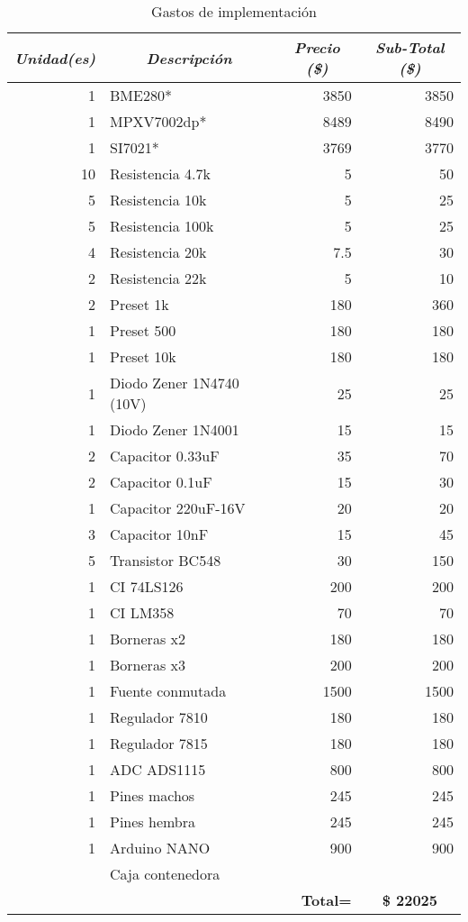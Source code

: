 \begin{table}[H]
	\centering
	\begin{tabular}{|r|l|r|r|}
		\hline
		\multicolumn{1}{|c|}{\textit{\textbf{Unidad(es)}}} & \multicolumn{1}{c|}{\textit{\textbf{Descripción}}} & \multicolumn{1}{c|}{\textit{\textbf{Precio (\$)}}} & \multicolumn{1}{c|}{\textit{\textbf{Sub-Total  (\$)}}} \\ \hline
		1 & BME280* & 3850 & 3850 \\ \hline
		1 & MPXV7002dp* & 8489 & 8490 \\ \hline
		1 & SI7021* & 3769 & 3770 \\ \hline
		10 & Resistencia 4.7k & 5 & 50 \\ \hline
		5 & Resistencia 10k & 5 & 25 \\ \hline
		5 & Resistencia 100k & 5 & 25 \\ \hline
		4 & Resistencia 20k & 7.5 & 30 \\ \hline
		2 & Resistencia 22k & 5 & 10 \\ \hline
		2 & Preset 1k & 180 & 360 \\ \hline
		1 & Preset 500 & 180 & 180 \\ \hline
		1 & Preset 10k & 180 & 180 \\ \hline
		1 & Diodo Zener 1N4740 (10V) & 25 & 25 \\ \hline
		1 & Diodo Zener 1N4001 & 15 & 15 \\ \hline
		2 & Capacitor 0.33uF & 35 & 70 \\ \hline
		2 & Capacitor 0.1uF & 15 & 30 \\ \hline
		1 & Capacitor 220uF-16V & 20 & 20 \\ \hline
		3 & Capacitor 10nF & 15 & 45 \\ \hline
		5 & Transistor BC548 & 30 & 150 \\ \hline
		1 & CI 74LS126 & 200 & 200 \\ \hline
		1 & CI LM358 & 70 & 70 \\ \hline
		1 & Borneras x2 & 180 & 180 \\ \hline
		1 & Borneras x3 & 200 & 200 \\ \hline
		1 & Fuente conmutada & 1500 & 1500 \\ \hline
		1 & Regulador 7810 & 180 & 180 \\ \hline
		1 & Regulador 7815 & 180 & 180 \\ \hline
		1 & ADC ADS1115 & 800 & 800 \\ \hline
		1 & Pines machos & 245 & 245 \\ \hline
		1 & Pines hembra & 245 & 245 \\ \hline
		1 & Arduino NANO & 900 & 900 \\ \hline
		\multicolumn{1}{|l|}{} & Caja contenedora & \multicolumn{1}{l|}{} & \multicolumn{1}{l|}{} \\ \hline
		\multicolumn{3}{|r|}{\textbf{Total=}} & \multicolumn{1}{c|}{\textbf{\$ 22025}} \\ \hline
	\end{tabular}
\caption{Gastos de implementación}
\label{gastos}

\end{table}
%
%
%
